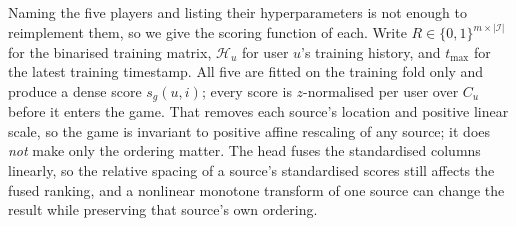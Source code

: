 \documentclass[pdflatex,sn-basic,Numbered]{sn-jnl}
\theoremstyle{plain}
\theoremstyle{definition}
\newcommand{\Cu}{C_u}
\begin{document}
Naming the five players and listing their hyperparameters is not enough to
reimplement them, so we give the scoring function of each. Write $R \in \{0,1\}^{m \times |\mathcal{I}|}$ for the
binarised training matrix, $\mathcal{H}_u$ for user $u$'s training history, and
$t_{\max}$ for the latest training timestamp. All five are fitted on the
training fold only and produce a dense score $s_g(u,i)$; every score is
$z$-normalised per user over $\Cu$ before it enters the game. That removes each
source's location and positive linear scale, so the game is invariant to
positive affine rescaling of any source; it does \emph{not} make only the
ordering matter. The head fuses the standardised columns linearly, so the
relative spacing of a source's standardised scores still affects the fused
ranking, and a nonlinear monotone transform of one source can change the result
while preserving that source's own ordering.
%
\end{document}
